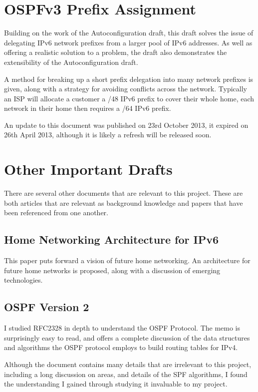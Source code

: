 \documentclass[12pt]{report}
\begin{document}
\section{OSPFv3 Prefix Assignment}
Building on the work of the Autoconfiguration draft, this
draft\cite{draft-arkko-homenet-prefix-assignment-03} solves the issue of
delegating IPv6 network prefixes from a larger pool of IPv6 addresses. As well
as offering a realistic solution to a problem, the draft also demonstrates the
extensibility of the Autoconfiguration draft. 

A method for breaking up a short prefix delegation into many network prefixes
is given, along with a strategy for avoiding conflicts across the network.
Typically an ISP will allocate a customer a /48 IPv6 prefix to cover their
whole home, each network in their home then requires a /64 IPv6 prefix.

An update to this document was published on 23rd October 2013, it expired on
26th April 2013, although it is likely a refresh will be released soon.

\section{Other Important Drafts}
There are several other documents that are relevant to this project. These are
both articles that are relevant as background knowledge and papers that have
been referenced from one another.

\subsection{Home Networking Architecture for IPv6} 
This paper\cite{draft-ietf-homenet-arch-07} puts forward a vision of future
home networking. An architecture for future home networks is proposed, along
with a discussion of emerging technologies. 

\subsection{OSPF Version 2}
I studied RFC2328\cite{RFC2328} in depth to understand the OSPF Protocol. The
memo is surprisingly easy to read, and offers a complete discussion of the data
structures and algorithms the OSPF protocol employs to build routing tables for
IPv4. 

Although the document contains many details that are irrelevant to this project, 
including a long discussion on areas, and details of the SPF algorithms, I found
the understanding I gained through studying it invaluable to my project.
\end{document}
